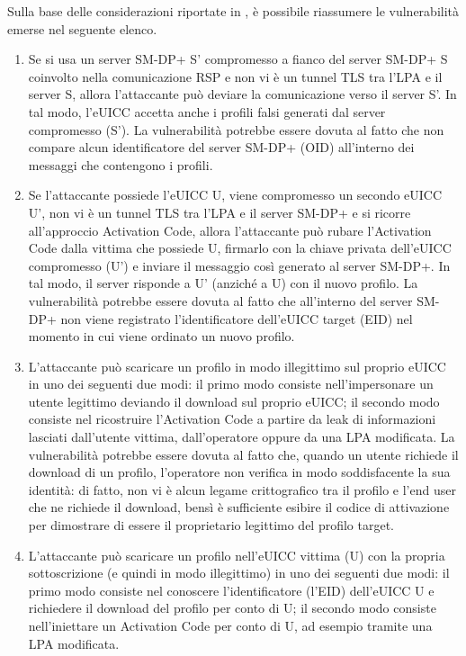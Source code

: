 \documentclass[10pt, oneside]{book}
\begin{document}
Sulla base delle considerazioni riportate in \cite{Sec-analysis}, è possibile riassumere le vulnerabilità emerse nel seguente elenco.
\begin{enumerate}
\item Se si usa un server SM-DP+ S' compromesso a fianco del server SM-DP+ S coinvolto nella comunicazione RSP e non vi è un tunnel TLS tra l'LPA e il server S, allora l'attaccante può deviare la comunicazione verso il server S'. In tal modo, l'eUICC accetta anche i profili falsi generati dal server compromesso (S'). La vulnerabilità potrebbe essere dovuta al fatto che non compare alcun identificatore del server SM-DP+ (OID) all'interno dei messaggi che contengono i profili.
\item Se l'attaccante possiede l'eUICC U, viene compromesso un secondo eUICC U', non vi è un tunnel TLS tra l'LPA e il server SM-DP+ e si ricorre all'approccio Activation Code, allora l'attaccante può rubare l'Activation Code dalla vittima che possiede U, firmarlo con la chiave privata dell'eUICC compromesso (U') e inviare il messaggio così generato al server SM-DP+. In tal modo, il server risponde a U' (anziché a U) con il nuovo profilo. La vulnerabilità potrebbe essere dovuta al fatto che all'interno del server SM-DP+ non viene registrato l'identificatore dell'eUICC target (EID) nel momento in cui viene ordinato un nuovo profilo.
\item L'attaccante può scaricare un profilo in modo illegittimo sul proprio eUICC in uno dei seguenti due modi: il primo modo consiste nell'impersonare un utente legittimo deviando il download sul proprio eUICC; il secondo modo consiste nel ricostruire l'Activation Code a partire da leak di informazioni lasciati dall'utente vittima, dall'operatore oppure da una LPA modificata. La vulnerabilità potrebbe essere dovuta al fatto che, quando un utente richiede il download di un profilo, l'operatore non verifica in modo soddisfacente la sua identità: di fatto, non vi è alcun legame crittografico tra il profilo e l'end user che ne richiede il download, bensì è sufficiente esibire il codice di attivazione per dimostrare di essere il proprietario legittimo del profilo target.
\item L'attaccante può scaricare un profilo nell'eUICC vittima (U) con la propria sottoscrizione (e quindi in modo illegittimo) in uno dei seguenti due modi: il primo modo consiste nel conoscere l'identificatore (l'EID) dell'eUICC U e richiedere il download del profilo per conto di U; il secondo modo consiste nell'iniettare un Activation Code per conto di U, ad esempio tramite una LPA modificata.

\end{enumerate}
\end{document}
